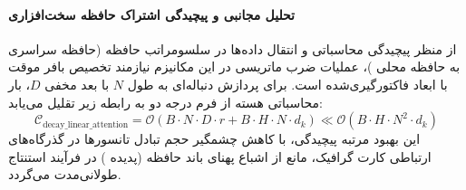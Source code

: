 \paragraph{تحلیل مجانبی و پیچیدگی اشتراک حافظه سخت‌افزاری}
از منظر پیچیدگی محاسباتی و انتقال داده‌ها در سلسومراتب حافظه (حافظه سراسری  به حافظه محلی )، عملیات ضرب ماتریسی در این مکانیزم نیازمند تخصیص بافر موقت با ابعاد فاکتورگیری‌شده است. برای پردازش دنباله‌ای به طول $N$ با بعد مخفی $D$، بار محاسباتی هسته از فرم درجه دو به رابطه زیر تقلیل می‌یابد:
\begin{equation}
\label{eq:complexity_decay_linear_attention}
\mathcal{C}_{\text{decay\_linear\_attention}} = \mathcal{O}\left( B \cdot N \cdot D \cdot r + B \cdot H \cdot N \cdot d_k \right) \ll \mathcal{O}\left( B \cdot H \cdot N^2 \cdot d_k \right)
\end{equation}
این بهبود مرتبه پیچیدگی، با کاهش چشمگیر حجم تبادل تانسورها در گذرگاه‌های ارتباطی کارت گرافیک، مانع از اشباع پهنای باند حافظه (پدیده ) در فرآیند استنتاج طولانی‌مدت می‌گردد.